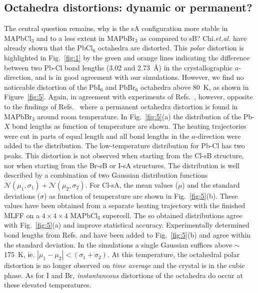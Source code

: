 \documentclass[journal=jpccck,manuscript=article,layout=twocolumn]{achemso}
\begin{document}
\subsection{Octahedra distortions: dynamic or permanent?}
 The central question remains, why is the sA configuration more stable in MAPbCl$_3$ and to a less extent in MAPbBr$_3$ as compared to sB? Chi.\textit{et.al.} have already shown that the PbCl$_6$ octahedra are distorted\cite{Chi:jssc05}. This \textit{polar} distortion is highlighted in Fig.~\ref{fig:1} by the green and orange lines indicating the difference between two Pb-Cl bond lengths (3.02 and 2.73~\AA) in the crystallographic $a$-direction, and is in good agreement with our simulations. However, we find no noticeable distortion of the PbI$_6$ and PbBr$_6$ octahedra above 80~K, as shown in Figure~\ref{fig:5}. Again, in agreement with experiments of Refs.~\cite{Govinda:jpcl16,Swainson:jssc03}, however, opposite to the findings of Refs.~\cite{Page:acie16,Bernasconi:acsenl17} where a permanent octahedra distortion is found in MAPbBr$_3$ around room temperature. In Fig.~\ref{fig:5}(a) the distribution of the Pb-$X$ bond lengths as function of temperature are shown. The heating trajectories were cut in parts of equal length and all bond lengths in the $a$-direction were added to the distribution. The low-temperature distribution for Pb-Cl has two peaks. This distortion is not observed when starting from the Cl-sB structure, nor when starting from the Br-sB or I-sA structures. The distribution is well described by a combination of two Gaussian distribution functions $\mathcal{N}(\mu_1,\sigma_1)+\mathcal{N}(\mu_2,\sigma_2)$. For Cl-sA, the mean values ($\mu$) and the standard deviations ($\sigma$) as function of temperature are shown in Fig.~\ref{fig:5}(b). These values have been obtained from a separate heating trajectory with the finished MLFF on a $4\times4\times4$ MAPbCl$_3$ supercell. The so obtained distributions agree with Fig.~\ref{fig:5}(a) and improve statistical accuracy. Experimentally determined bond lengths from Refs.\cite{Chi:jssc05} and \cite{Bernasconi:jpcc18} have been added to Fig.~\ref{fig:5}(b) and agree within the standard deviation. In the simulations a single Gaussian suffices above $\sim$175~K, ie. $|\mu_1-\mu_2|< (\sigma_1+\sigma_2)$. At this temperature, the octahedral polar distortion is no longer observed on \textit{time average} and the crystal is in the cubic phase. As for I and Br, \textit{instantaneous} distortions of the octahedra do occur at these elevated temperatures.
\end{document}
